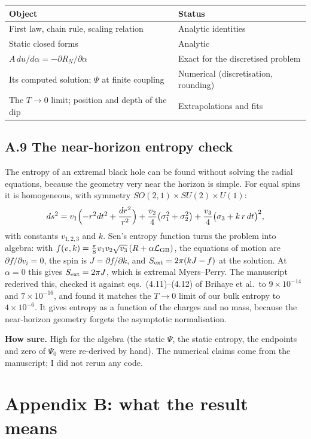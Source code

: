\documentclass[12pt,a4paper]{article}
\begin{document}
\begin{center}\small
\begin{tabular}{@{}p{}p{}@{}}
\hline
Object & Status \\ \hline
First law, chain rule, scaling relation & Analytic identities \\
Static closed forms & Analytic \\
$A\,du/d\alpha=-\partial R_N/\partial\alpha$ & Exact for the discretised problem \\
Its computed solution; $\Psi$ at finite coupling & Numerical (discretisation, rounding) \\
The $T\to0$ limit; position and depth of the dip & Extrapolations and fits \\ \hline
\end{tabular}
\end{center}

\subsection*{A.9 The near-horizon entropy check}

The entropy of an extremal black hole can be found without solving the radial
equations, because the geometry very near the horizon is simple. For equal spins it
is homogeneous, with symmetry $SO(2,1)\times SU(2)\times U(1)$:
\[
ds^2=v_1\Bigl(-r^2dt^2+\frac{dr^2}{r^2}\Bigr)+\frac{v_2}{4}\bigl(\sigma_1^2+\sigma_2^2\bigr)
+\frac{v_3}{4}\bigl(\sigma_3+k\,r\,dt\bigr)^2 ,
\]
with constants $v_{1,2,3}$ and $k$. Sen's entropy function turns the problem into
algebra: with $f(v,k)=\frac{\pi}{8}v_1v_2\sqrt{v_3}\,(R+\alpha\mathcal L_{\rm GB})$, the
equations of motion are $\partial f/\partial v_i=0$, the spin is $J=\partial f/\partial k$,
and $S_{\rm ext}=2\pi(kJ-f)$ at the solution. At $\alpha=0$ this gives $S_{\rm ext}=2\pi J$,
which is extremal Myers--Perry. The manuscript rederived this, checked it against
eqs.\ (4.11)--(4.12) of Brihaye et al.\ to $9\times10^{-14}$ and $7\times10^{-16}$,
and found it matches the $T\to0$ limit of our bulk entropy to $4\times10^{-6}$. It
gives entropy as a function of the charges and no mass, because the near-horizon
geometry forgets the asymptotic normalisation.

\textbf{How sure.} High for the algebra (the static $\Psi$, the static entropy, the
endpoints and zero of $\Psi_0$ were re-derived by hand). The numerical claims come
from the manuscript; I did not rerun any code.

\newpage
\section*{Appendix B: what the result means}
\end{document}
